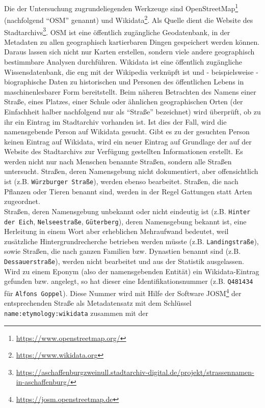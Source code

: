 \documentclass[ngerman,twocolumn,showpacs,%
  nofootinbib,aps,superscriptaddress,%
  eqsecnum,prd,notitlepage,showkeys,10pt,report]{revtex4-2}
\begin{document}
Die der Untersuchung zugrundeliegenden Werkzeuge sind OpenStreetMap\footnote{\url{https://www.openstreetmap.org/}} (nachfolgend
“OSM” genannt) und Wikidata\footnote{\url{https://www.wikidata.org}}. Als Quelle dient die Website des Stadtarchivs\footnote{\url{https://aschaffenburgzweinull.stadtarchiv-digital.de/projekt/strassennamen-in-aschaffenburg/}}.
OSM ist eine öffentlich zugängliche Geodatenbank, in der Metadaten zu allen geographisch
kartierbaren Dingen gespeichert werden können. Daraus lassen sich nicht nur Karten
erstellen, sondern viele andere geographisch bestimmbare Analysen durchführen.
Wikidata ist eine öffentlich zugängliche Wissensdatenbank, die eng mit der Wikipedia
verknüpft ist und - beispielsweise - biographische Daten zu historischen und Personen des
öffentlichen Lebens in maschinenlesbarer Form bereitstellt.
Beim näheren Betrachten des Namens einer Straße, eines Platzes, einer Schule oder
ähnlichen geographischen Orten (der Einfachheit halber nachfolgend nur als “Straße”
bezeichnet) wird überprüft, ob zu ihr ein Eintrag im Stadtarchiv vorhanden ist. Ist dies der
Fall, wird die namensgebende Person auf Wikidata gesucht. Gibt es zu der gesuchten
Person keinen Eintrag auf Wikidata, wird ein neuer Eintrag auf Grundlage der auf der
Website des Stadtarchivs zur Verfügung gestellten Informationen erstellt. Es werden nicht
nur nach Menschen benannte Straßen, sondern alle Straßen untersucht. Straßen, deren
Namensgebung nicht dokumentiert, aber offensichtlich ist (z.B. \texttt{Würzburger Straße}),
werden ebenso bearbeitet. Straßen, die nach Pflanzen oder Tieren benannt sind, werden in
der Regel Gattungen statt Arten zugeordnet.\\
Straßen, deren Namensgebung unbekannt oder nicht eindeutig ist (z.B. \texttt{Hinter der Eich},
\texttt{Nelseestraße}, \texttt{Güterberg}), deren Namensgebung bekannt ist, eine Herleitung in einem
Wort aber erheblichen Mehraufwand bedeutet, weil zusätzliche Hintergrundrecherche
betrieben werden müsste (z.B. \texttt{Landingstraße}), sowie Straßen, die nach ganzen Familien
bzw. Dynastien benannt sind (z.B. \texttt{Dessauerstraße}), werden nicht bearbeitet und aus der
Statistik ausgelassen.\\
Wird zu einem Eponym (also der namensgebenden Entität) ein Wikidata-Eintrag gefunden
bzw. angelegt, so hat dieser eine Identifikationsnummer (z.B. \texttt{Q481434} für \texttt{Alfons Goppel}).
Diese Nummer wird mit Hilfe der Software JOSM\footnote{\url{https://josm.openstreetmap.de}} der entsprechenden Straße als
Metadatensatz mit dem Schlüssel \texttt{name:etymology:wikidata} zusammen mit der
\end{document}
